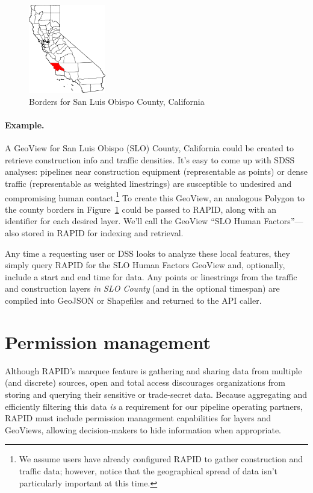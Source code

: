 \begin{figure}
    \centering

    \includegraphics[width=0.3\textwidth]{figures/slo_county.png}
    
    \caption{Borders for San Luis Obispo County, California}
    \label{fig:county}
    
\end{figure}

\paragraph{Example.}
A GeoView for San Luis Obispo (SLO) County, California could be created to retrieve construction info and traffic densities. It's easy to come up with SDSS analyses: pipelines near construction equipment (representable as points) or dense traffic (representable as weighted linestrings) are susceptible to undesired and compromising human contact.\footnote{We assume users have already configured RAPID to gather construction and traffic data; however, notice that the geographical spread of data isn't particularly important at this time.} To create this GeoView, an analogous Polygon to the county borders in Figure~\ref{fig:county} could be passed to RAPID, along with an identifier for each desired layer. We'll call the GeoView ``SLO Human Factors''---also stored in RAPID for indexing and retrieval.

Any time a requesting user or DSS looks to analyze these local features, they simply query RAPID for the SLO Human Factors GeoView and, optionally, include a start and end time for data. Any points or linestrings from the traffic and construction layers \textit{in SLO County} (and in the optional timespan) are compiled into GeoJSON or Shapefiles and returned to the API caller.

\section{Permission management}
Although RAPID's marquee feature is gathering and sharing data from multiple (and discrete) sources, open and total access discourages organizations from storing and querying their sensitive or trade-secret data. Because aggregating and efficiently filtering this data \textit{is} a requirement for our pipeline operating partners, RAPID must include permission management capabilities for layers and GeoViews, allowing decision-makers to hide information when appropriate.


